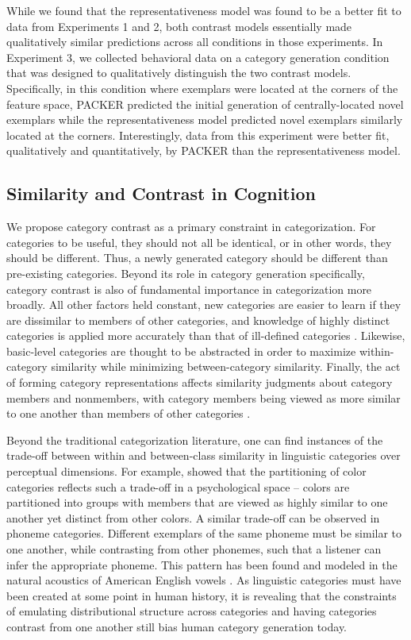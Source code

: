 \documentclass[pdflatex,sn-apa]{sn-jnl}%
\theoremstyle{thmstyleone}%
\theoremstyle{thmstyletwo}%
\theoremstyle{thmstylethree}%
\begin{document}
While we found that the representativeness model was found to be a better fit to
data from Experiments 1 and 2, both contrast models essentially made
qualitatively similar predictions across all conditions in those experiments. In
Experiment 3, we collected behavioral data on a category generation condition
that was designed to qualitatively distinguish the two contrast models. Specifically, in this
condition where exemplars were located at the corners of the feature space,
PACKER predicted the initial generation of centrally-located novel exemplars
while the representativeness model predicted novel exemplars similarly located
at the corners. Interestingly, data from this experiment were better fit,
qualitatively and quantitatively, by PACKER than the representativeness model.

\subsection{Similarity and Contrast in Cognition}
We propose category contrast as a primary constraint in categorization. For
categories to be useful, they should not all be identical, or in other words,
they should be different. Thus, a newly generated category should be different
than pre-existing categories. Beyond its role in category generation
specifically, category contrast is also of fundamental importance in
categorization more broadly. All other factors held constant, new categories are
easier to learn if they are dissimilar to members of other categories, and
knowledge of highly distinct categories is applied more accurately than that of
ill-defined categories \citep{ashby1994categorization,imai1965discriminability}.
Likewise, basic-level categories \citep{rosch1976basic} are thought to be
abstracted in order to maximize within-category similarity while minimizing
between-category similarity. Finally, the act of forming category
representations affects similarity judgments about category members and
nonmembers, with category members being viewed as more similar to one another
than members of other categories
\citep{goldstone1994influences,goldstone2001altering,goldstone1996isolated}.

Beyond the traditional categorization literature, one can find instances of the trade-off between within
and between-class similarity in linguistic categories over perceptual
dimensions. For example, \cite{regier2007} showed that the partitioning of color
categories reflects such a trade-off in a psychological space -- colors are
partitioned into groups with members that are viewed as highly similar to one
another yet distinct from other colors. A similar trade-off can be observed in
phoneme categories. Different exemplars of the same phoneme must be similar to
one another, while contrasting from other phonemes, such that a listener can
infer the appropriate phoneme. This pattern has been found and modeled in the
natural acoustics of American English vowels
\citep{feldman2013,hillenbrand1995}. As linguistic categories must have been
created at some point in human history, it is revealing that the constraints of
emulating distributional structure across categories and having categories
contrast from one another still bias human category generation today.
\end{document}
